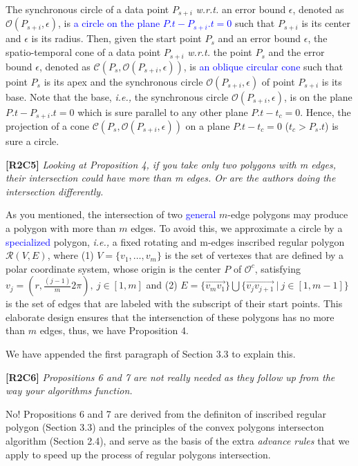 \documentclass{letter}
\newcommand{\ie}{\emph{i.e.,}\xspace}
\newcommand{\wrt}{\emph{w.r.t.}\xspace}
\newcommand{\cone}[1]{{$\mathcal{C}{#1}$}}
\renewcommand{\circle}[1]{{$\mathcal{O}{#1}$}}
\newcommand{\pcircle}[1]{{$\mathcal{O}^c{#1}$}}
\begin{document}
The synchronous circle of a data point $P_{s+i}$ \wrt an error bound $\epsilon$, denoted as \circle{(P_{s+i}, \epsilon)}, is \textcolor{blue}{a circle on the plane $P.t-P_{s+i}.t = 0$} such that $P_{s+i}$ is its center and $\epsilon$ is its radius.
%
Then, given the start point $P_s$ and an error bound $\epsilon$, the spatio-temporal cone of a data point $P_{s+i}$ \wrt the point $P_s$ and the error bound $\epsilon$, denoted as \cone{(P_s, \mathcal{O}(P_{s+i}, \epsilon))}, is \textcolor{blue}{an oblique circular cone} such that point $P_s$ is its apex and the synchronous circle $\mathcal{O}(P_{s+i}, \epsilon)$ of point $P_{s+i}$ is its base. Note that the base, \ie the synchronous circle $\mathcal{O}(P_{s+i}, \epsilon)$, is on the plane $P.t-P_{s+i}.t = 0$ which is sure parallel to any other plane $P.t- t_c = 0$. Hence, the  projection of a cone \cone{(P_s, \mathcal{O}(P_{s+i}, \epsilon))} on a plane $P.t- t_c = 0$ ($t_c > P_s.t$) is sure a circle.


\textbf{[R2C5]} \emph{Looking at Proposition 4, if you take only two polygons with m edges, their intersection could have more than m edges. Or are the authors doing the intersection differently.}

As you mentioned, the intersection of two \textcolor{blue}{general} $m$-edge polygons may produce a polygon with more than $m$ edges. To avoid this, we approximate a circle by a \textcolor{blue}{specialized} polygon, \ie a fixed rotating and m-edges inscribed regular polygon $\mathcal{R}(V, E)$,
where (1) $V=\{v_1, \ldots, v_{m}\}$ is the set of vertexes that are defined by a polar coordinate system, whose origin is the center $P$ of \pcircle{}, satisfying $v_j = (r, \frac{(j-1)}{m}2\pi), ~j \in [1, m]$
and (2) $E= \{\overrightarrow{v_mv_1}\} \bigcup \{\overrightarrow{v_jv_{j+1}}\ |\ j\in [1, m-1]\}$ is the set of edges that are labeled with the subscript of their start points.
This elaborate design ensures that the intersenction of these polygons has no more than $m$ edges, thus, we have Proposition 4.

We have appended the first paragraph of Section 3.3 to explain this. 

\textbf{[R2C6]} \emph{Propositions 6 and 7 are not really needed as they follow up from the way your algorithms function.}

No! Propositions 6 and 7 are derived from the definiton of inscribed regular polygon (Section 3.3) and the principles of the convex polygons intersecton algorithm (Section 2.4), and serve as the basis of the extra \emph{advance rules} that we apply to speed up the process of regular polygons intersection. 
\end{document}
